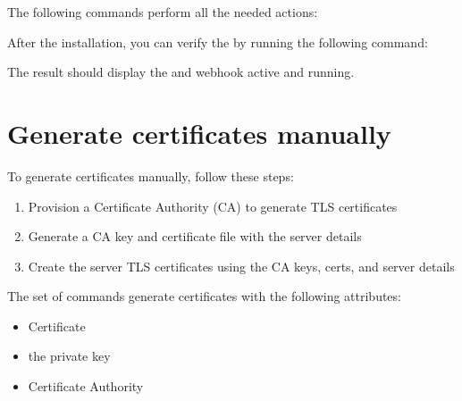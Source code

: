 \documentclass[letterpaper,10pt,english]{sphinxmanual}
\begin{document}
The following commands perform all the needed actions:

\begin{sphinxVerbatim}[commandchars=\\\{\}]
    
\end{sphinxVerbatim}

After the installation, you can verify the  by running the following command:

\begin{sphinxVerbatim}[commandchars=\\\{\}]
    
\end{sphinxVerbatim}

The result should display the  and webhook active and running.


\section{Generate certificates manually}
\label{\detokenize{TLS:generate-certificates-manually}}
To generate certificates manually, follow these steps:
\begin{enumerate}
%
\item {} 
Provision a Certificate Authority (CA) to generate TLS certificates

\item {} 
Generate a CA key and certificate file with the server details

\item {} 
Create the server TLS certificates using the CA keys, certs, and server details

\end{enumerate}

The set of commands generate certificates with the following attributes:
\begin{itemize}
\item {} 
 \sphinxhyphen{} Certificate

\item {} 
 \sphinxhyphen{} the private key

\item {} 
 \sphinxhyphen{} Certificate Authority

\end{itemize}
\end{document}
